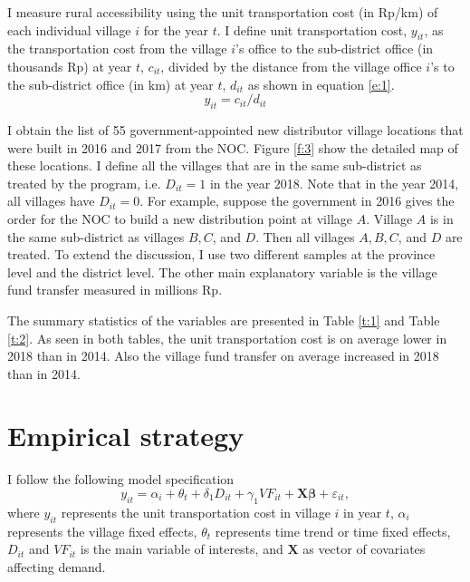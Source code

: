 \documentclass[letterpaper,12pt,leqno]{article}
\begin{document}
I measure rural accessibility using the unit transportation cost (in Rp/km) of each individual village $i$ for the year $t$. I define unit transportation cost, $y_{it}$, as the transportation cost from the village $i$'s office to the sub-district office (in thousands Rp) at year $t$, $c_{it}$, divided by the distance from the village office $i$'s to the sub-district office (in km) at year $t$, $d_{it}$ as shown in equation \eqref{e:1}.
\begin{equation}
        y_{it}=c_{it}/d_{it}\label{e:1}
\end{equation}

I obtain the list of 55 government-appointed new distributor village locations that were built in 2016 and 2017 from the NOC. Figure \ref{f:3} show the detailed map of these locations. I define all the villages that are in the same sub-district as treated by the program, i.e. $D_{it}=1$ in the year 2018. Note that in the year 2014, all villages have $D_{it}=0$. For example, suppose the government in 2016 gives the order for the NOC to build a new distribution point at village $A$. Village $A$ is in the same sub-district as villages $B,C$, and $D$. Then all villages $A,B,C$, and $D$ are treated. To extend the discussion, I use two different samples at the province level and the district level. The other main explanatory variable is the village fund transfer measured in millions Rp.

The summary statistics of the variables are presented in Table \ref{t:1} and Table \ref{t:2}. As seen in both tables, the  unit transportation cost is on average lower in 2018 than in 2014. Also the village fund transfer on average increased in 2018 than in 2014.


\section{Empirical strategy}\label{s:strategy}

I follow the following model specification
\begin{equation}
    y_{it}=\alpha_i+\theta_t+\delta_1 D_{it}+\gamma_1 VF_{it}+\textbf{X}\pmb{\beta}+\varepsilon_{it},\label{e:2}
\end{equation}
where $y_{it}$ represents the unit transportation cost in village $i$ in year $t$,
$\alpha_i$ represents the village fixed effects, $\theta_t$ represents time trend or time fixed effects, $D_{it}$ and $VF_{it}$ is the main variable of interests, and $\textbf{X}$ as vector of covariates affecting demand. 
\end{document}

